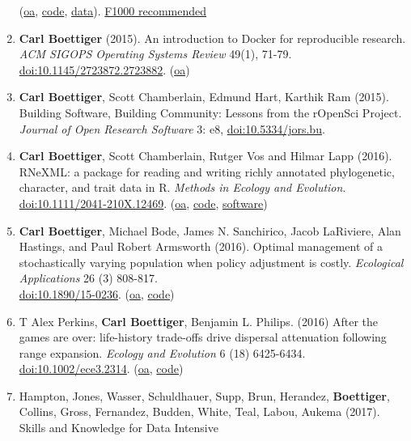 \documentclass[10pt,sans]{moderncv}        %
\begin{document}
\begin{enumerate}
  (\href{http://arxiv.org/abs/1412.8081}{oa},
  \href{https://github.com/cboettig/nonparametric-bayes}{code},
  \href{http://dx.doi.org/10.5061/dryad.mj226}{data}).
  \href{https://f1000.com/prime/725302626}{F1000 recommended}
\item
  \textbf{Carl Boettiger} (2015). An introduction to Docker for
  reproducible research. \emph{ACM SIGOPS Operating Systems Review}
  49(1), 71-79.
  \href{http://dx.doi.org/10.1145/2723872.2723882}{doi:10.1145/2723872.2723882}.
  (\href{http://arxiv.org/abs/1410.0846}{oa})
\item
  \textbf{Carl Boettiger}, Scott Chamberlain, Edmund Hart, Karthik Ram
  (2015). Building Software, Building Community: Lessons from the
  rOpenSci Project. \emph{Journal of Open Research Software} 3: e8,
  \href{http://dx.doi.org/10.5334/jors.bu}{doi:10.5334/jors.bu}.
\item
  \textbf{Carl Boettiger}, Scott Chamberlain, Rutger Vos and Hilmar Lapp
  (2016). RNeXML: a package for reading and writing richly annotated
  phylogenetic, character, and trait data in R. \emph{Methods in Ecology
  and Evolution}.
  \href{http://dx.doi.org/10.1111/2041-210X.12469}{doi:10.1111/2041-210X.12469}.
  (\href{http://arxiv.org/abs/1506.02722}{oa},
  \href{https://github.com/ropensci/RNeXML}{code},
  \href{http://cran.rstudio.com/web/packages/RNeXML}{software})
\item
  \textbf{Carl Boettiger}, Michael Bode, James N. Sanchirico, Jacob
  LaRiviere, Alan Hastings, and Paul Robert Armsworth (2016). Optimal
  management of a stochastically varying population when policy
  adjustment is costly. \emph{Ecological Applications} 26 (3) 808-817.\\
  \href{http://dx.doi.org/10.1890/15-0236}{doi:10.1890/15-0236}.
  (\href{http://arxiv.org/pdf/1507.07037v1.pdf}{oa},
  \href{https://github.com/cboettig/pdg_control}{code})
\item
  T Alex Perkins, \textbf{Carl Boettiger}, Benjamin L. Philips. (2016)
  After the games are over: life-history trade-offs drive dispersal
  attenuation following range expansion. \emph{Ecology and Evolution} 6
  (18) 6425-6434.
  \href{http://dx.doi.org/10.1002/ece3.2314}{doi:10.1002/ece3.2314}.
  (\href{http://oadoi.org/10.1002/ece3.2314}{oa},
  \href{https://github.com/TAlexPerkins/dispersal_tradeoffs}{code})
\item
  Hampton, Jones, Wasser, Schuldhauer, Supp, Brun, Herandez,
  \textbf{Boettiger}, Collins, Gross, Fernandez, Budden, White, Teal,
  Labou, Aukema (2017). Skills and Knowledge for Data Intensive

\end{enumerate}
\end{document}
